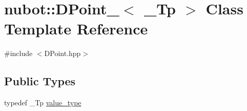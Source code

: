\hypertarget{classnubot_1_1DPoint__}{\section{nubot\-:\-:D\-Point\-\_\-$<$ \-\_\-\-Tp $>$ Class Template Reference}
\label{classnubot_1_1DPoint__}
}


{\ttfamily \#include $<$D\-Point.\-hpp$>$}

\subsection*{Public Types}
\begin{DoxyCompactItemize}
\item 
typedef \-\_\-\-Tp \hyperlink{classnubot_1_1DPoint___a1a546245bbee6a62f83ed6126035c61a}{value\-\_\-type}
\end{DoxyCompactItemize}
